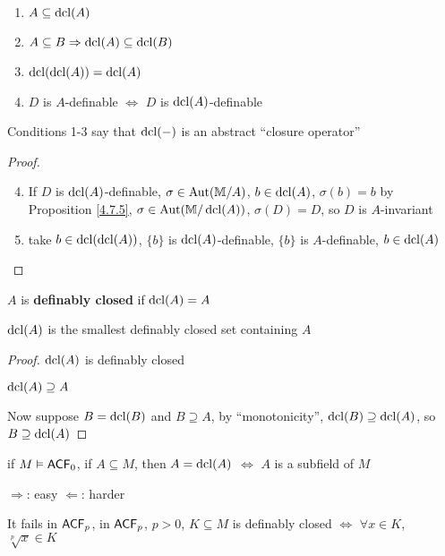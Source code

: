 \documentclass[11pt]{article}
\begin{document}
\begin{proposition}[]
\label{4.7.6}
\begin{enumerate}
\item \(A\subseteq\operatorname{dcl}(A)\)
\item \(A\subseteq B\Rightarrow\operatorname{dcl}(A)\subseteq\operatorname{dcl}(B)\)
\item \(\operatorname{dcl}(\operatorname{dcl}(A))=\operatorname{dcl}(A)\)
\item \(D\) is \(A\)-definable \(\Leftrightarrow\) \(D\) is \(\operatorname{dcl}(A)\)-definable
\end{enumerate}

Conditions 1-3 say that \(\operatorname{dcl}(-)\) is an abstract ``closure operator''
\end{proposition}

\begin{proof}
\begin{enumerate}
\setcounter{enumi}{3}
\item If \(D\) is \(\operatorname{dcl}(A)\)-definable, \(\sigma\in\operatorname{\text{Aut}}(\mathbb{M}/A)\),  \(b\in\operatorname{dcl}(A)\), \(\sigma(b)=b\) by
Proposition \ref{4.7.5}, \(\sigma\in\operatorname{\text{Aut}}(\mathbb{M}/\operatorname{dcl}(A))\), \(\sigma(D)=D\), so \(D\) is \(A\)-invariant
\setcounter{enumi}{2}
\item take \(b\in\operatorname{dcl}(\operatorname{dcl}(A))\), \(\{b\}\) is \(\operatorname{dcl}(A)\)-definable, \(\{b\}\) is \(A\)-definable, \(b\in\operatorname{dcl}(A)\)
\end{enumerate}
\end{proof}

\begin{definition}[]
\(A\) is \textbf{definably closed} if \(\operatorname{dcl}(A)=A\)
\end{definition}

\begin{proposition}[]
\(\operatorname{dcl}(A)\) is the smallest definably closed set containing \(A\)
\end{proposition}

\begin{proof}
\(\operatorname{dcl}(A)\) is definably closed

\(\operatorname{dcl}(A)\supseteq A\)

Now suppose \(B=\operatorname{dcl}(B)\) and \(B\supseteq A\), by ``monotonicity'', \(\operatorname{dcl}(B)\supseteq\operatorname{dcl}(A)\), so \(B\supseteq\operatorname{dcl}(A)\)
\end{proof}

\begin{fact}[]
if \(M\vDash\textsf{ACF}_0\), if \(A\subseteq M\), then \(A=\operatorname{dcl}(A)\) \(\Leftrightarrow\) \(A\) is a subfield of \(M\)

\(\Rightarrow\): easy
\(\Leftarrow\): harder

It fails in \(\textsf{ACF}_p\), in \(\textsf{ACF}_p\), \(p>0\), \(K\subseteq M\) is definably
closed \(\Leftrightarrow\) \(\forall x\in K\), \(\sqrt[p]{x}\in K\)
\end{fact}
\end{document}
